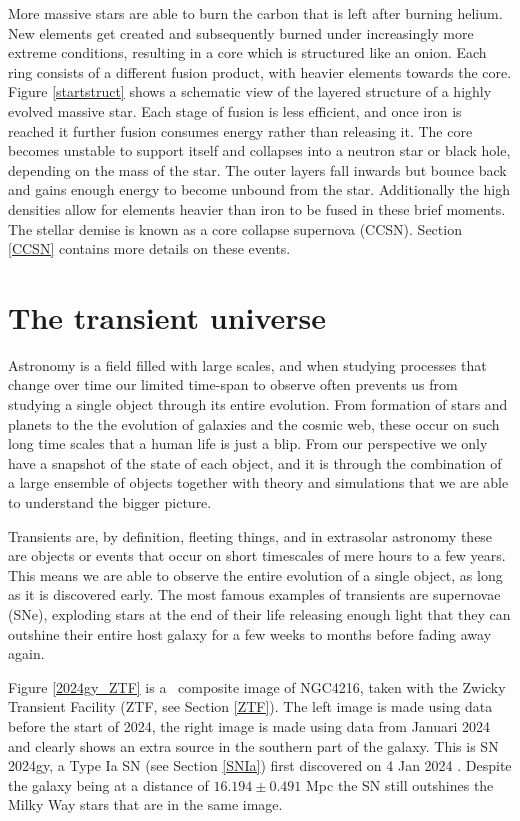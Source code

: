 \documentclass[a4paper,oneside,12pt, class=Latex/Classes/PhDthesisPSnPDF, crop=false]{standalone}
\begin{document}
More massive stars are able to burn the carbon that is left after burning helium. New elements get created and subsequently burned under increasingly more extreme conditions, resulting in a core which is structured like an onion. Each ring consists of a different fusion product, with heavier elements towards the core. Figure \ref{startstruct} shows a schematic view of the layered structure of a highly evolved massive star. Each stage of fusion is less efficient, and once iron is reached it further fusion consumes energy rather than releasing it. The core becomes unstable to support itself and collapses into a neutron star or black hole, depending on the mass of the star. The outer layers fall inwards but bounce back and gains enough energy to become unbound from the star. Additionally the high densities allow for elements heavier than iron to be fused in these brief moments. The stellar demise is known as a core collapse supernova (CCSN). Section \ref{CCSN} contains more details on these events.


\section{The transient universe}
Astronomy is a field filled with large scales, and when studying processes that change over time our limited time-span to observe often prevents us from studying a single object through its entire evolution. From formation of stars and planets to the the evolution of galaxies and the cosmic web, these occur on such long time scales that a human life is just a blip. From our perspective we only have a snapshot of the state of each object, and it is through the combination of a large ensemble of objects together with theory and simulations that we are able to understand the bigger picture.

Transients are, by definition, fleeting things, and in extrasolar astronomy these are objects or events that occur on short timescales of mere hours to a few years. This means we are able to observe the entire evolution of a single object, as long as it is discovered early. The most famous examples of transients are supernovae (SNe), exploding stars at the end of their life releasing enough light that they can outshine their entire host galaxy for a few weeks to months before fading away again.

Figure \ref{2024gy_ZTF} is a \ztfg\ztfr\ztfi\ composite image of NGC4216, taken with the Zwicky Transient Facility (ZTF, see Section \ref{ZTF}). The left image is made using data before the start of 2024, the right image is made using data from Januari 2024 and clearly shows an extra source in the southern part of the galaxy. This is SN 2024gy, a Type Ia SN (see Section \ref{SNIa}) first discovered on 4 Jan 2024 \citep{2024gy_disc}. Despite the galaxy being at a distance of $16.194 \pm 0.491$ Mpc \citep{2024gy_z} the SN still outshines the Milky Way stars that are in the same image.
\end{document}

